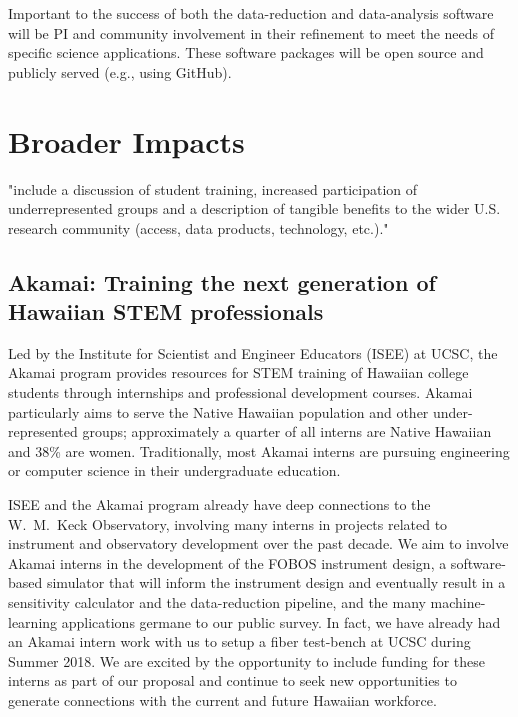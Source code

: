 \documentclass[oneside,11pt]{amsart}
\newcommand{\comment}[2][todo]{{\color{#1}[[{\bf #2}]]}}
\begin{document}
Important to the success of both the data-reduction and data-analysis
software will be PI and community involvement in their refinement to
meet the needs of specific science applications.  These software
packages will be open source and publicly served (e.g., using GitHub).


\section{Broader Impacts}
\label{sec:bi}

"include a discussion of student training, increased participation of
underrepresented groups and a description of tangible benefits to the
wider U.S. research community (access, data products, technology,
etc.)."

\subsection{Akamai: Training the next generation of Hawaiian STEM professionals}

Led by the Institute for Scientist and Engineer Educators (ISEE) at
UCSC, the Akamai program provides resources for STEM training of
Hawaiian college students through internships and professional
development courses.  Akamai particularly aims to serve the Native
Hawaiian population and other under-represented groups; approximately a
quarter of all interns are Native Hawaiian and 38\% are women.
Traditionally, most Akamai interns are pursuing engineering or 
computer science in their undergraduate education.

ISEE and the Akamai program already have deep connections to the
W.~M.~Keck Observatory, involving many interns in projects related to
instrument and observatory development over the past decade.  We aim to
involve Akamai interns in the development of the FOBOS instrument
design, a software-based simulator that will inform the instrument
design and eventually result in a sensitivity calculator and the
data-reduction pipeline, and the many machine-learning applications
germane to our public survey.  In fact, we have already had an Akamai
intern work with us to setup a fiber test-bench at UCSC during Summer
2018.  We are excited by the opportunity to include funding for these
interns as part of our proposal and continue to seek new opportunities
to generate connections with the current and future Hawaiian workforce.
\end{document}
